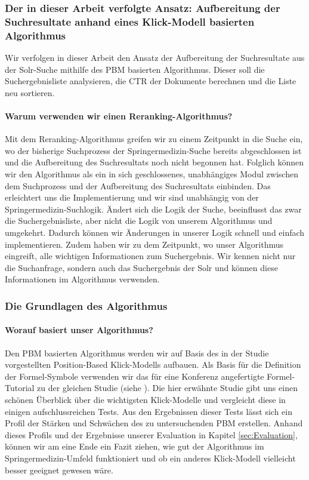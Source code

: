 \subsubsection{Der in dieser Arbeit verfolgte Ansatz: Aufbereitung der Suchresultate anhand eines Klick-Modell basierten Algorithmus}
\label{sec:Grundlagen:Grundbegriffe:Result-RerankingPBM:AnsatzSucheEinbinden}

Wir verfolgen in dieser Arbeit den Ansatz der Aufbereitung der Suchresultate aus der Solr-Suche mithilfe des PBM basierten Algorithmus. Dieser soll die Suchergebnisliste analysieren, die CTR der Dokumente berechnen und die Liste neu sortieren. 

\paragraph{Warum verwenden wir einen Reranking-Algorithmus?}
Mit dem Reranking-Algorithmus greifen wir zu einem Zeitpunkt in die Suche ein, wo der bisherige Suchprozess der Springermedizin-Suche bereits abgeschlossen ist und die Aufbereitung des Suchresultats noch nicht begonnen hat. Folglich können wir den Algorithmus als ein in sich geschlossenes, unabhängiges Modul zwischen dem Suchprozess und der Aufbereitung des Suchresultats einbinden. Das erleichtert uns die Implementierung und wir sind unabhängig von der Springermedizin-Suchlogik. Ändert sich die Logik der Suche, beeinflusst das zwar die Suchergebnisliste, aber nicht die Logik von unserem Algorithmus und umgekehrt. Dadurch können wir Änderungen in unserer Logik schnell und einfach implementieren. Zudem haben wir zu dem Zeitpunkt, wo unser Algorithmus eingreift, alle wichtigen Informationen zum Suchergebnis. Wir kennen nicht nur die Suchanfrage, sondern auch das Suchergebnis der Solr und können diese Informationen im Algorithmus verwenden.

\subsubsection{Die Grundlagen des Algorithmus}
\label{sec:Grundlagen:Grundbegriffe:Result-RerankingPBM:Grundlagen}

\paragraph{Worauf basiert unser Algorithmus?}
Den PBM basierten Algorithmus werden wir auf Basis des in der Studie \cite{pbm} vorgestellten Position-Based Klick-Modells aufbauen. Als Basis für die Definition der Formel-Symbole verwenden wir das für eine Konferenz angefertigte Formel-Tutorial zu der gleichen Studie (siehe \cite{pbmTutorial}). Die hier erwähnte Studie gibt uns einen schönen Überblick über die wichtigsten Klick-Modelle und vergleicht diese in einigen aufschlussreichen Tests. Aus den Ergebnissen dieser Tests lässt sich ein Profil der Stärken und Schwächen des zu untersuchenden PBM erstellen. Anhand dieses Profils und der Ergebnisse unserer Evaluation in Kapitel \ref{sec:Evaluation}, können wir am eine Ende ein Fazit ziehen, wie gut der Algorithmus im Springermedizin-Umfeld funktioniert und ob ein anderes Klick-Modell vielleicht besser geeignet gewesen wäre.

